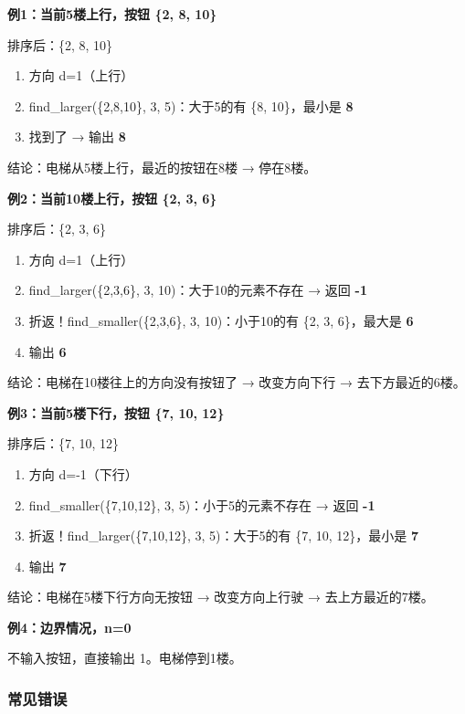 \textbf{例1：当前5楼上行，按钮 \{2, 8, 10\}}

排序后：\{2, 8, 10\}

\begin{enumerate}
    \item 方向 d=1（上行）
    \item find\_larger(\{2,8,10\}, 3, 5)：大于5的有 \{8, 10\}，最小是 \textbf{8}
    \item 找到了 → 输出 \textbf{8}
\end{enumerate}

结论：电梯从5楼上行，最近的按钮在8楼 → 停在8楼。

\vspace{0.4em}
\textbf{例2：当前10楼上行，按钮 \{2, 3, 6\}}

排序后：\{2, 3, 6\}

\begin{enumerate}
    \item 方向 d=1（上行）
    \item find\_larger(\{2,3,6\}, 3, 10)：大于10的元素不存在 → 返回 \textbf{-1}
    \item 折返！find\_smaller(\{2,3,6\}, 3, 10)：小于10的有 \{2, 3, 6\}，最大是 \textbf{6}
    \item 输出 \textbf{6}
\end{enumerate}

结论：电梯在10楼往上的方向没有按钮了 → 改变方向下行 → 去下方最近的6楼。

\vspace{0.4em}
\textbf{例3：当前5楼下行，按钮 \{7, 10, 12\}}

排序后：\{7, 10, 12\}

\begin{enumerate}
    \item 方向 d=-1（下行）
    \item find\_smaller(\{7,10,12\}, 3, 5)：小于5的元素不存在 → 返回 \textbf{-1}
    \item 折返！find\_larger(\{7,10,12\}, 3, 5)：大于5的有 \{7, 10, 12\}，最小是 \textbf{7}
    \item 输出 \textbf{7}
\end{enumerate}

结论：电梯在5楼下行方向无按钮 → 改变方向上行驶 → 去上方最近的7楼。

\vspace{0.4em}
\textbf{例4：边界情况，n=0}

不输入按钮，直接输出 1。电梯停到1楼。

\subsubsection{常见错误}

